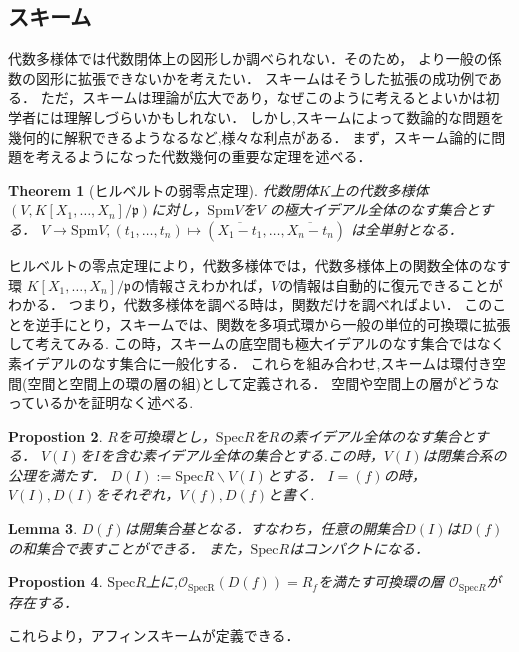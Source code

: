 \documentclass{ujarticle}
\newtheorem{thm}{Theorem}[section]
\newtheorem{prop}[thm]{Propostion}
\newtheorem{lem}[thm]{Lemma}
\begin{document}
\subsection{スキーム}
\label{sub:スキーム}
代数多様体では代数閉体上の図形しか調べられない．そのため，
より一般の係数の図形に拡張できないかを考えたい．
スキームはそうした拡張の成功例である．
ただ，スキームは理論が広大であり，なぜこのように考えるとよいかは初学者には理解しづらいかもしれない．
しかし,スキームによって数論的な問題を幾何的に解釈できるようなるなど,様々な利点がある．
まず，スキーム論的に問題を考えるようになった代数幾何の重要な定理を述べる．
\begin{thm}[ヒルベルトの弱零点定理]
代数閉体$K$上の代数多様体$(V,K[X_1,\dots,X_n]/\mathfrak{p})$に対し，$\mathrm{Spm}V$を$V$
の極大イデアル全体のなす集合とする．
$V \to \mathrm{Spm}V,(t_1,\dots,t_n)\mapsto (\overline{X_1 - t_1},\dots,\overline{X_n - t_n})$
は全単射となる．
\end{thm}

ヒルベルトの零点定理により，代数多様体では，代数多様体上の関数全体のなす環
$K[X_1,\dots,X_n]/\mathfrak{p}$の情報さえわかれば，$V$の情報は自動的に復元できることがわかる．
つまり，代数多様体を調べる時は，関数だけを調べればよい．
このことを逆手にとり，スキームでは、関数を多項式環から一般の単位的可換環に拡張して考えてみる.
この時，スキームの底空間も極大イデアルのなす集合ではなく素イデアルのなす集合に一般化する．
これらを組み合わせ,スキームは環付き空間(空間と空間上の環の層の組)として定義される．
空間や空間上の層がどうなっているかを証明なく述べる.

\begin{prop}
$R$を可換環とし，$\mathrm{Spec}R$を$R$の素イデアル全体のなす集合とする．
$V(I)$を$I$を含む素イデアル全体の集合とする.この時，$V(I)$は閉集合系の公理を満たす．
$D(I):=\mathrm{Spec}R \backslash V(I)$とする．
$I=(f)$の時，$V(I),D(I)$をそれぞれ，$V(f),D(f)$と書く.
\end{prop}

\begin{lem}
 $D(f)$は開集合基となる．すなわち，任意の開集合$D(I)$は$D(f)$の和集合で表すことができる．
 また，$\mathrm{Spec}R$はコンパクトになる．
\end{lem}

\begin{prop}
 $\mathrm{Spec}R$上に,$\mathcal{O}_{\mathrm{SpecR}}(D(f))=R_f$を満たす可換環の層
 $\mathcal{O}_{\mathrm{Spec}R}$が存在する．
\end{prop}

これらより，アフィンスキームが定義できる．
\end{document}
